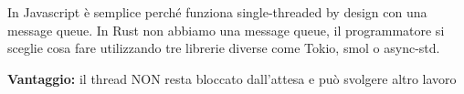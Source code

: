 In Javascript è semplice perché funziona single-threaded by design con una message queue.
In Rust non abbiamo una message queue, il programmatore si sceglie cosa fare utilizzando
tre librerie diverse come Tokio, smol o async-std.

\begin{tcolorbox}
  \textbf{Vantaggio:} il thread NON resta bloccato dall'attesa e può svolgere altro lavoro
\end{tcolorbox}













